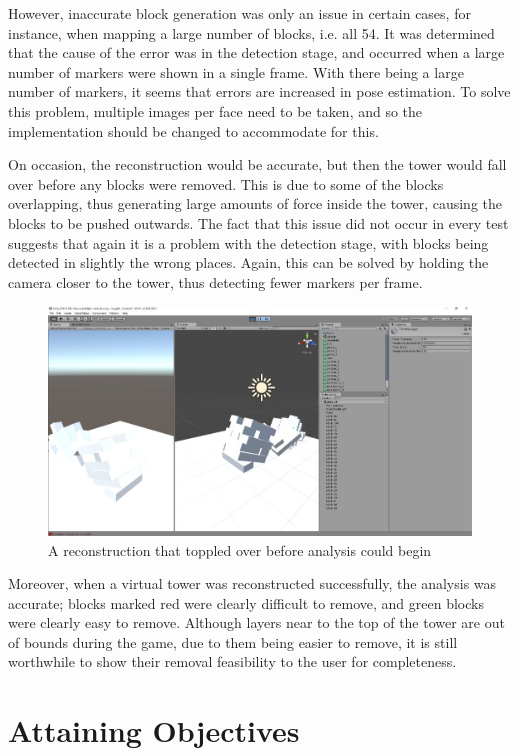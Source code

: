 However, inaccurate block generation was only an issue in certain cases, for instance, when mapping a large number of blocks, i.e. all 54. It was determined that the cause of the error was in the detection stage, and occurred when a large number of markers were shown in a single frame. With there being a large number of markers, it seems that errors are increased in pose estimation. To solve this problem, multiple images per face need to be taken, and so the implementation should be changed to accommodate for this.

On occasion, the reconstruction would be accurate, but then the tower would fall over before any blocks were removed. This is due to some of the blocks overlapping, thus generating large amounts of force inside the tower, causing the blocks to be pushed outwards. The fact that this issue did not occur in every test suggests that again it is a problem with the detection stage, with blocks being detected in slightly the wrong places. Again, this can be solved by holding the camera closer to the tower, thus detecting fewer markers per frame.

\begin{figure}[ht]
    \centering
    \includegraphics[width=.7\linewidth]{images/testing/smallgame2.jpg}
    \caption{A reconstruction that toppled over before analysis could begin}
    \label{fig:unsettled}
\end{figure}



Moreover, when a virtual tower was reconstructed successfully, the analysis was accurate; blocks marked red were clearly difficult to remove, and green blocks were clearly easy to remove. Although layers near to the top of the tower are out of bounds during the game, due to them being easier to remove, it is still worthwhile to show their removal feasibility to the user for completeness.

\section{Attaining Objectives}

